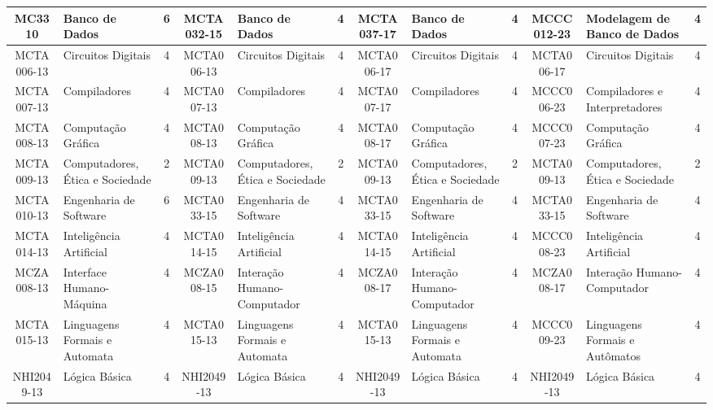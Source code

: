 \documentclass[a4paper]{article}
\begin{document}
\begin{landscape}
{\begin{longtable}{|c|p{.2\textheight}|c||c|p{.2\textheight}|c||c|p{.2\textheight}|c||c|p{.2\textheight}|c|}
    MC3310 & Banco de Dados & 6 &
    MCTA032-15 & Banco de Dados & 4 &
    MCTA037-17 & Banco de Dados & 4 &
    MCCC012-23 & Modelagem de Banco de Dados & 4 \\ \hline

    MCTA006-13 & Circuitos Digitais & 4 &
    MCTA006-13 & Circuitos Digitais & 4 &
    MCTA006-17 & Circuitos Digitais & 4 &
    MCTA006-17 & Circuitos Digitais & 4 \\ \hline

    MCTA007-13 & Compiladores & 4 &
    MCTA007-13 & Compiladores & 4 &
    MCTA007-17 & Compiladores & 4 & 
    MCCC006-23 & Compiladores e Interpretadores & 4 \\ \hline

    MCTA008-13 & Computação Gráfica & 4 &
    MCTA008-13 & Computação Gráfica & 4 &
    MCTA008-17 & Computação Gráfica & 4 &
    MCCC007-23 & Computação Gráfica & 4 \\ \hline

    MCTA009-13 & Computadores, Ética e Sociedade & 2 &
    MCTA009-13 & Computadores, Ética e Sociedade & 2 &
    MCTA009-13 & Computadores, Ética e Sociedade & 2 &
    MCTA009-13 & Computadores, Ética e Sociedade & 2 \\ \hline

    MCTA010-13 & Engenharia de Software & 6 &
    MCTA033-15 & Engenharia de Software & 4 & 
    MCTA033-15 & Engenharia de Software & 4 & 
    MCTA033-15 & Engenharia de Software & 4 \\ \hline

    MCTA014-13 & Inteligência Artificial & 4 &
    MCTA014-15 & Inteligência Artificial & 4 & 
    MCTA014-15 & Inteligência Artificial & 4 &
    MCCC008-23 & Inteligência Artificial & 4 \\ \hline

    MCZA008-13 & Interface Humano-Máquina    & 4 &
    MCZA008-15 & Interação Humano-Computador & 4 &
    MCZA008-17 & Interação Humano-Computador & 4 &
    MCZA008-17 & Interação Humano-Computador & 4\\ \hline


    MCTA015-13 & Linguagens Formais e Automata & 4 &
    MCTA015-13 & Linguagens Formais e Automata & 4 &
    MCTA015-13 & Linguagens Formais e Automata & 4 & 
    MCCC009-23 & Linguagens Formais e Autômatos & 4 \\ \hline

    NHI2049-13 & Lógica Básica & 4 &
    NHI2049-13 & Lógica Básica & 4 &
    NHI2049-13 & Lógica Básica & 4 &
    NHI2049-13 & Lógica Básica & 4 \\


\end{longtable}}
\end{landscape}
\end{document}
